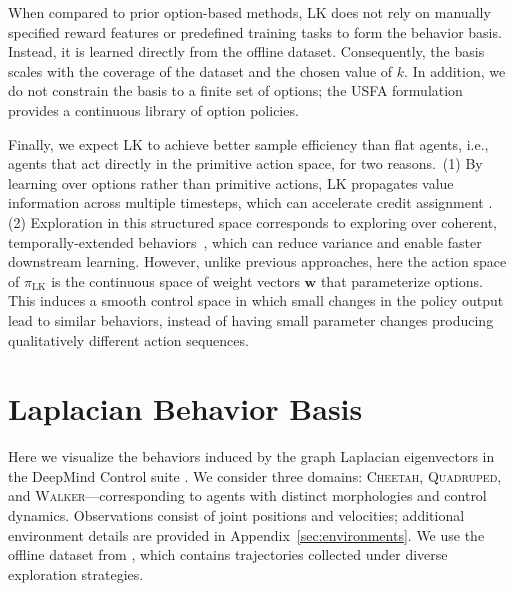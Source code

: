 \documentclass{article}
\theoremstyle{plain}
\theoremstyle{definition}
\theoremstyle{remark}
\begin{document}
When compared to prior option-based methods, LK does not rely on manually specified reward features or predefined training tasks to form the behavior basis. Instead, it is learned directly from the offline dataset. Consequently, the basis scales with the coverage of the dataset and the chosen value of $k$. In addition, we do not constrain the basis to a finite set of options; the USFA formulation provides a continuous library of option policies.


Finally, we expect LK to achieve better sample efficiency than flat agents, i.e., agents that act directly in the primitive action space, for two reasons.~(1) By learning over options rather than primitive actions, LK propagates value information across multiple timesteps, which can accelerate credit assignment \citep{sutton1999between}. (2) Exploration in this structured space corresponds to exploring over coherent, temporally-extended behaviors~\citep{machado2017laplacian,machado2023temporal,jinnai2019discovering}, which can reduce variance and enable faster downstream learning. However, unlike previous approaches, here the action space of $\pi_{\text{LK}}$ is the continuous space of weight vectors $\mathbf{w}$ that parameterize options. This induces a smooth control space in which small changes in the policy output lead to similar behaviors, instead of having small parameter changes producing qualitatively different action sequences.  


\section{Laplacian Behavior Basis}

Here we visualize the behaviors induced by the graph Laplacian eigenvectors in the DeepMind Control suite \citep[DMC;][]{tassa2018deepmind}. We consider three domains: \textsc{Cheetah}, \textsc{Quadruped}, and \textsc{Walker}---corresponding to agents with distinct morphologies and control dynamics. Observations consist of joint positions and velocities; additional environment details are provided in Appendix~\ref{sec:environments}. We use the offline dataset from \citet{yarats2022exorl}, which contains trajectories collected under diverse exploration strategies.
\end{document}
